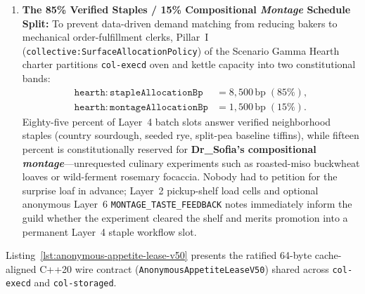 \begin{enumerate}
    \item \textbf{The 85\% Verified Staples / 15\% Compositional \emph{Montage} Schedule Split:}
    To prevent data-driven demand matching from reducing bakers to mechanical order-fulfillment clerks,
    Pillar~I (\texttt{collective:SurfaceAllocationPolicy}) of the Scenario Gamma Hearth charter partitions
    \texttt{col-execd} oven and kettle capacity into two constitutional bands:
    \begin{equation}
    \begin{aligned}
        \mathtt{hearth:stapleAllocationBp} &= 8{,}500\,\mathrm{bp}\;(85\%), \\
        \mathtt{hearth:montageAllocationBp} &= 1{,}500\,\mathrm{bp}\;(15\%).
    \end{aligned}
        \label{eq:gamma-85-15-montage}
    \end{equation}
    Eighty-five percent of Layer~4 batch slots answer verified neighborhood staples (country sourdough,
    seeded rye, split-pea baseline tiffins), while fifteen percent is constitutionally reserved for
    \textbf{Dr\_Sofia's compositional \emph{montage}}---unrequested culinary experiments such as
    roasted-miso buckwheat loaves or wild-ferment rosemary focaccia. Nobody had to petition for the
    surprise loaf in advance; Layer~2 pickup-shelf load cells and optional anonymous Layer~6
    \texttt{MONTAGE\_TASTE\_FEEDBACK} notes immediately inform the guild whether the experiment cleared
    the shelf and merits promotion into a permanent Layer~4 staple workflow slot.
\end{enumerate}

Listing~\ref{lst:anonymous-appetite-lease-v50} presents the ratified 64-byte cache-aligned C++20 wire
contract (\texttt{AnonymousAppetiteLeaseV50}) shared across \texttt{col-execd} and \texttt{col-storaged}.

